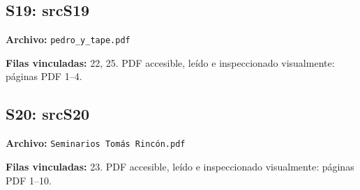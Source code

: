 \documentclass[11pt,a4paper]{article}
\begin{document}
\subsection*{\hypertarget{fuente-S19}{S19}: \csname srcS19\endcsname}
{\small\textbf{Archivo:} \texttt{pedro\_\allowbreak{}y\_\allowbreak{}tape.pdf}

\textbf{Filas vinculadas:} 22, 25. PDF accesible, leído e inspeccionado visualmente: páginas PDF 1--4.}
\subsection*{\hypertarget{fuente-S20}{S20}: \csname srcS20\endcsname}
{\small\textbf{Archivo:} \texttt{Seminarios Tomás Rincón.pdf}

\textbf{Filas vinculadas:} 23. PDF accesible, leído e inspeccionado visualmente: páginas PDF 1--10.}
\end{document}
